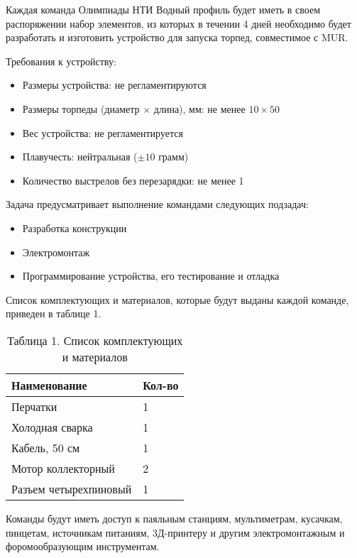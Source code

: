 
Каждая команда Олимпиады НТИ Водный профиль будет иметь в своем распоряжении набор элементов, из которых в течении 4 дней необходимо будет разработать и изготовить устройство для запуска торпед, совместимое с MUR. 

Требования к устройству:
\begin{itemize}
    \item Размеры устройства: не регламентируются
    \item Размеры торпеды (диаметр $\times$ длина), мм: не менее $10 \times 50$
    \item Вес устройства: не регламентируется
    \item Плавучесть: нейтральная ($\pm 10$ грамм)
    \item Количество выстрелов без перезарядки: не менее 1
\end{itemize}

Задача предусматривает выполнение командами следующих подзадач:
\begin{itemize}
    \item Разработка конструкции
    \item Электромонтаж 
    \item Программирование устройства, его тестирование и отладка
\end{itemize}

Список комплектующих и материалов, которые будут выданы каждой команде, приведен в таблице 1.

\begin{table}[H]
    \center
    \caption{Таблица 1. Список комплектующих и материалов}
    \begin{tabular}{|l|l|}
        \hline
        \textbf{Наименование} & \textbf{Кол-во} \\
        \hline
        Перчатки & 1 \\
        \hline
        Холодная сварка & 1 \\
        \hline
        Кабель, 50 см & 1 \\
        \hline
        Мотор коллекторный & 2 \\
        \hline
        Разъем четырехпиновый & 1 \\
        \hline
    \end{tabular}
\end{table}

Команды будут иметь доступ к паяльным станциям, мультиметрам, кусачкам, пинцетам, источникам питаниям, 3Д-принтеру и другим электромонтажным и форомообразующим инструментам. 

